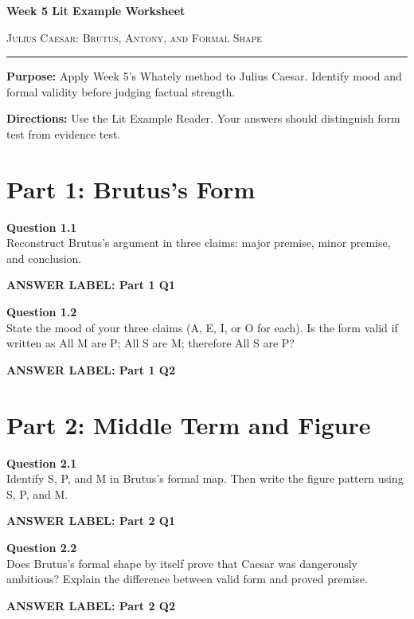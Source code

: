 \documentclass[12pt]{article}
\newcommand{\answerbox}[2]{%
\vspace{0.12em}
\noindent\textbf{#1}\par
\vspace{0.04em}
\noindent\fbox{%
\begin{minipage}[t][#2]{\dimexpr\textwidth-2\fboxsep-2\fboxrule}
\rule{\textwidth}{0pt}
\vspace{#2}
\end{minipage}}
\par\vspace{0.22em}}
\begin{document}
\begin{center}
{\LARGE\bfseries Week 5 Lit Example Worksheet}\par\vspace{0.05em}
{\large\scshape Julius Caesar: Brutus, Antony, and Formal Shape}\par\vspace{0.12em}
\rule{0.78\textwidth}{0.5pt}
\end{center}

\textbf{Purpose:} Apply Week 5's Whately method to Julius Caesar. Identify mood and formal validity before judging factual strength.

\textbf{Directions:} Use the Lit Example Reader. Your answers should distinguish form test from evidence test.

\section*{Part 1: Brutus's Form}

\textbf{Question 1.1}\\[-0.15em]
Reconstruct Brutus's argument in three claims: major premise, minor premise, and conclusion.

\answerbox{ANSWER LABEL: Part 1 Q1}{2.45in}

\textbf{Question 1.2}\\[-0.15em]
State the mood of your three claims (A, E, I, or O for each). Is the form valid if written as All M are P; All S are M; therefore All S are P?

\answerbox{ANSWER LABEL: Part 1 Q2}{2.25in}

\newpage

\section*{Part 2: Middle Term and Figure}

\textbf{Question 2.1}\\[-0.15em]
Identify S, P, and M in Brutus's formal map. Then write the figure pattern using S, P, and M.

\answerbox{ANSWER LABEL: Part 2 Q1}{2.35in}

\textbf{Question 2.2}\\[-0.15em]
Does Brutus's formal shape by itself prove that Caesar was dangerously ambitious? Explain the difference between valid form and proved premise.

\answerbox{ANSWER LABEL: Part 2 Q2}{2.45in}
\end{document}
